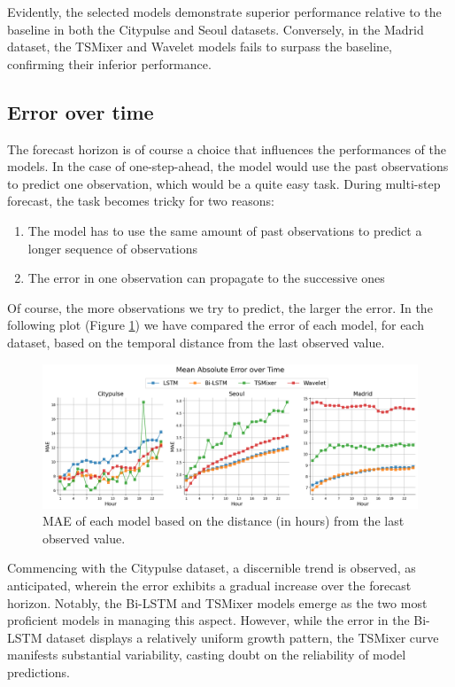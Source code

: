 Evidently, the selected models demonstrate superior performance relative to the baseline in both the Citypulse and Seoul datasets. Conversely, in the Madrid dataset, the TSMixer and Wavelet models fails to surpass the baseline, confirming their inferior performance.

\subsection{Error over time}

The forecast horizon is of course a choice that influences the performances of the models. In the case of one-step-ahead, the model would use the past observations to predict one observation, which would be a quite easy task. During multi-step forecast, the task becomes tricky for two reasons:
\begin{enumerate}
    \item The model has to use the same amount of past observations to predict a longer sequence of observations
    \item The error in one observation can propagate to the successive ones
\end{enumerate}

Of course, the more observations we try to predict, the larger the error.
In the following plot (Figure \ref{fig:mae-per-hour}) we have compared the error of each model, for each dataset, based on the temporal distance from the last observed value.

\begin{figure}
    \centering
    \includegraphics[width=1\linewidth]{images/mae_per_hour.png}
    \caption{MAE of each model based on the distance (in hours) from the last observed value.}
    \label{fig:mae-per-hour}
\end{figure}

Commencing with the Citypulse dataset, a discernible trend is observed, as anticipated, wherein the error exhibits a gradual increase over the forecast horizon. Notably, the Bi-LSTM and TSMixer models emerge as the two most proficient models in managing this aspect. However, while the error in the Bi-LSTM dataset displays a relatively uniform growth pattern, the TSMixer curve manifests substantial variability, casting doubt on the reliability of model predictions.

